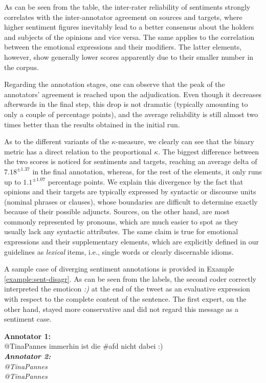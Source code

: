 As can be seen from the table, the
inter-rater reliability of sentiments strongly correlates with the
inter-annotator agreement on sources and targets, where higher
sentiment figures inevitably lead to a better consensus about the
holders and subjects of the opinions and vice versa.  The same applies
to the correlation between the emotional expressions and their
modifiers. The latter elements, however, show generally lower scores
apparently due to their smaller number in the corpus.

Regarding the annotation stages, one can observe that the peak of the
annotators' agreement is reached upon the adjudication.  Even though
it decreases afterwards in the final step, this drop is not dramatic
(typically amounting to only a couple of percentage points), and the
average reliability is still almost two times better than the results
obtained in the initial run.

As to the different variants of the $\kappa$-measure, we clearly can
see that the binary metric has a direct relation to the proportional
$\kappa$.  The biggest difference between the two scores is noticed
for sentiments and targets, reaching an average delta of
$7.18^{\pm1.37}$ in the final annotation, whereas, for the rest of the
elements, it only runs up to $1.1^{\pm1.07}$ percentage points.  We
explain this divergence by the fact that opinions and their targets
are typically expressed by syntactic or discourse units (nominal
phrases or clauses), whose boundaries are difficult to determine
exactly because of their possible adjuncts.  Sources, on the other
hand, are most commonly represented by pronouns, which are much easier
to spot as they usually lack any syntactic attributes.  The same claim
is true for emotional expressions and their supplementary elements,
which are explicitly defined in our guidelines as \emph{lexical}
items, i.e., single words or clearly discernable idioms.

A sample case of diverging sentiment annotations is provided in
Example \ref{example:sent-disagr}.  As can be seen from the labels, the
second coder correctly interpreted the emoticon \emph{:)} at the end
of the tweet as an evaluative expression with respect to the complete
content of the sentence.  The first expert, on the other hand, stayed
more conservative and did not regard this message as a sentiment case.

{
  \renewcommand{\thesection}{\arabic{section}}
  \begin{example}\label{example:sent-disagr}
    \textbf{Annotator 1:}\\
    \upshape{}@TinaPannes immerhin ist die \#afd nicht
      dabei :)\\[0.8em]\itshape
    \textbf{Annotator 2:}\\
    \upshape{}@TinaPannes \sentiment{\textcolor{red}{immerhin ist die
        \#afd nicht dabei :)}}\\[0.8em]
    \noindent\itshape{}@TinaPannes
    \upshape{}
  \end{example}
}

